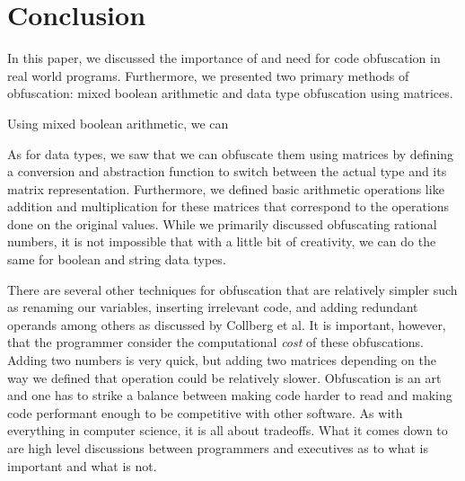 \section{Conclusion}
In this paper, we discussed the importance of and need for code
obfuscation in real world programs. Furthermore, we presented two primary
methods of obfuscation: mixed boolean arithmetic and data type obfuscation
using matrices.

Using mixed boolean arithmetic, we can

As for data types, we saw that we can obfuscate them using matrices by defining
a conversion and abstraction function to switch between the actual type and its
matrix representation. Furthermore, we defined basic arithmetic operations like
addition and multiplication for these matrices that correspond to the
operations done on the original values. While we primarily discussed
obfuscating rational numbers, it is not impossible that with a little bit of
creativity, we can do the same for boolean and string data types.

There are several other techniques for obfuscation that are relatively simpler
such as renaming our variables, inserting irrelevant code, and adding redundant
operands among others as discussed by Collberg et al. It is important, however,
that the programmer consider the computational \textit{cost} of these
obfuscations. Adding two numbers is very quick, but adding two matrices
depending on the way we defined that operation could be relatively slower.
Obfuscation is an art and one has to strike a balance between making code
harder to read and making code performant enough to be competitive with other
software. As with everything in computer science, it is all about tradeoffs.
What it comes down to are high level discussions between programmers and
executives as to what is important and what is not.